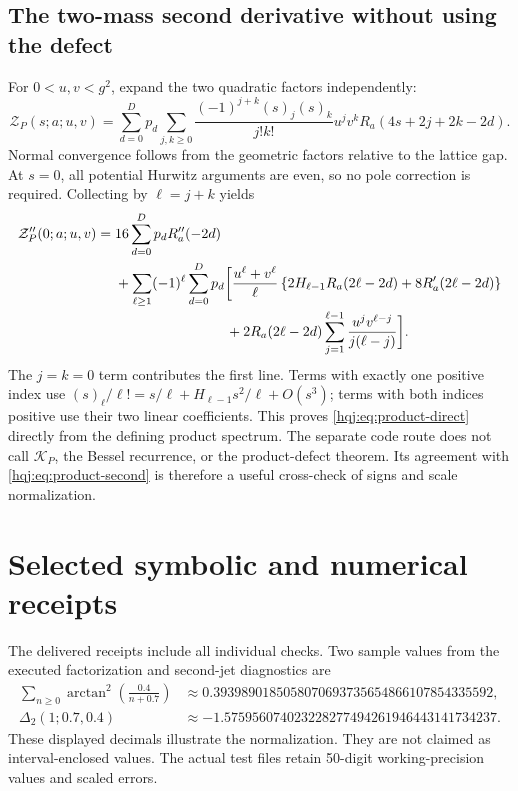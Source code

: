 \documentclass[11pt,letterpaper]{article}
\numberwithin{equation}{section}
\theoremstyle{definition}
\begin{document}
\subsection{The two-mass second derivative without using the defect}
For $0<u,v<g^2$, expand the two quadratic factors independently:
\begin{equation}\label{hqj:eq:double-Pochhammer}
\mathcal Z_P(s;a;u,v)=
\sum_{d=0}^Dp_d\sum_{j,k\ge0}
\frac{(-1)^{j+k}(s)_j(s)_k}{j!k!}u^jv^k
R_a(4s+2j+2k-2d).
\end{equation}
Normal convergence follows from the geometric factors relative to
the lattice gap. At $s=0$, all potential Hurwitz arguments are even,
so no pole correction is required. Collecting by $\ell=j+k$ yields
\begin{align}
\mathcal Z_P''(0;a;u,v)
={}&16\sum_{d=0}^Dp_dR_a''(-2d)
\notag\\
&+\sum_{\ell\ge1}(-1)^\ell\sum_{d=0}^Dp_d
\biggl[\frac{u^\ell+v^\ell}{\ell}
\left\{2H_{\ell-1}R_a(2\ell-2d)+8R_a'(2\ell-2d)\right\}
\notag\\[-2pt]
&\hspace{28mm}+2R_a(2\ell-2d)
\sum_{j=1}^{\ell-1}\frac{u^jv^{\ell-j}}{j(\ell-j)}\biggr].
\label{hqj:eq:product-direct}
\end{align}
The $j=k=0$ term contributes the first line. Terms with exactly one
positive index use
$(s)_\ell/\ell!=s/\ell+H_{\ell-1}s^2/\ell+O(s^3)$;
terms with both indices positive use their two linear coefficients.
This proves \eqref{hqj:eq:product-direct} directly from the defining
product spectrum. The separate code route does not call
$\mathcal K_P$, the Bessel recurrence, or the product-defect theorem.
Its agreement with \eqref{hqj:eq:product-second} is therefore a useful
cross-check of signs and scale normalization.

\section{Selected symbolic and numerical receipts}
\label{hqj:sec:receipts}
The delivered receipts include all individual checks. Two sample values
from the executed factorization and second-jet diagnostics are
\begin{align*}
\sum_{n\ge0}\arctan^2\!\left(\frac{0.4}{n+0.7}\right)
&\approx0.3939890185058070693735654866107854335592,\\
\Delta_2(1;0.7,0.4)
&\approx-1.575956074023228277494261946443141734237.
\end{align*}
These displayed decimals illustrate the normalization. They are not
claimed as interval-enclosed values. The actual test files retain
50-digit working-precision values and scaled errors.
\end{document}
